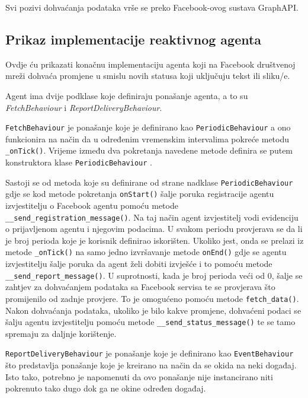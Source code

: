\documentclass[a4paper,12pt]{foi}
\begin{document}
Svi pozivi dohvaćanja podataka vrše se preko Facebook-ovog sustava GraphAPI.

\subsection{Prikaz implementacije reaktivnog agenta}

Ovdje ću prikazati konačnu implementaciju agenta koji na Facebook društvenoj mreži dohvaća promjene u smislu novih statusa koji uključuju tekst ili sliku/e.

\lstset{commentstyle=\textit,language=python}


Agent ima dvije podklase koje definiraju ponašanje agenta, a to su \textit{FetchBehaviour} i \textit{ReportDeliveryBehaviour}.

\texttt{FetchBehaviour} je ponašanje koje je definirano kao \texttt{PeriodicBehaviour} a ono funkcionira na način da u određenim vremenskim intervalima pokreće metodu \texttt{\_onTick()}. Vrijeme između dva pokretanja navedene metode definira se putem konstruktora klase \texttt{PeriodicBehaviour} \citep{ArandaPalanca2012}. 

Sastoji se od metoda koje su definirane od strane nadklase \texttt{PeriodicBehaviour} gdje se kod metode pokretanja \texttt{onStart()} šalje poruka registracije agentu izvjestitelju o Facebook agentu pomoću metode \texttt{\_\_send\_registration\_message()}. Na taj način agent izvjestitelj vodi evidenciju o prijavljenom agentu i njegovim podacima. U svakom periodu provjerava se da li je broj perioda koje je korisnik definirao iskorišten. Ukoliko jest, onda se prelazi iz metode \texttt{\_onTick()} na samo jedno izvršavanje metode \texttt{onEnd()} gdje se agentu izvjestitelju šalje poruka da agent želi dobiti izvješće i to pomoću metode \texttt{\_\_send\_report\_message()}. U suprotnosti, kada je broj perioda veći od 0, šalje se zahtjev za dohvaćanjem podataka sa Facebook servisa te se provjerava što promijenilo od zadnje provjere. To je omogućeno pomoću metode \texttt{fetch\_data()}. Nakon dohvaćanja podataka, ukoliko je bilo kakve promjene, dohvaćeni podaci se šalju agentu izvjestitelju pomoću metode \texttt{\_\_send\_status\_message()} te se tamo spremaju za daljnje korištenje.

\texttt{ReportDeliveryBehaviour} je ponašanje koje je definirano kao \texttt{EventBehaviour} što predstavlja ponašanje koje je kreirano na način da se okida na neki događaj. Isto tako, potrebno je napomenuti da ovo ponašanje nije instancirano niti pokrenuto tako dugo dok ga ne okine određen događaj.
\end{document}
